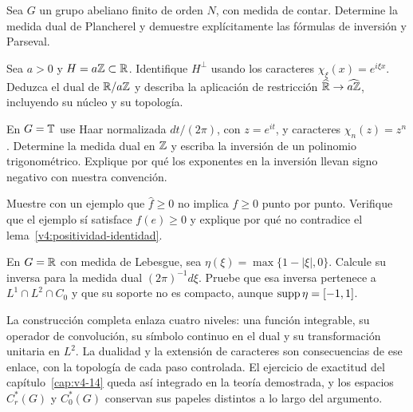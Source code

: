 \begin{ejercicio}\label{ej:v4-ampl-16-1}
Sea $G$ un grupo abeliano finito de orden $N$, con medida de contar. Determine la medida dual de Plancherel y demuestre explícitamente las fórmulas de inversión y Parseval.
\end{ejercicio}


\begin{ejercicio}\label{ej:v4-ampl-16-2}
Sea $a>0$ y $H=a\mathbb Z\subset\mathbb R$. Identifique $H^\perp$ usando los caracteres $\chi_\xi(x)=e^{i\xi x}$. Deduzca el dual de $\mathbb R/a\mathbb Z$ y describa la aplicación de restricción $\widehat{\mathbb R}\to\widehat{a\mathbb Z}$, incluyendo su núcleo y su topología.
\end{ejercicio}


\begin{ejercicio}\label{ej:v4-ampl-16-3}
En $G=\mathbb T$ use Haar normalizada $dt/(2\pi)$, con $z=e^{it}$, y caracteres $\chi_n(z)=z^n$. Determine la medida dual en $\mathbb Z$ y escriba la inversión de un polinomio trigonométrico. Explique por qué los exponentes en la inversión llevan signo negativo con nuestra convención.
\end{ejercicio}


\begin{ejercicio}\label{ej:v4-ampl-16-4}
Muestre con un ejemplo que $\widehat f\ge0$ no implica $f\ge0$ punto por punto. Verifique que el ejemplo sí satisface $f(e)\ge0$ y explique por qué no contradice el lema~\ref{v4:positividad-identidad}.
\end{ejercicio}


\begin{ejercicio}\label{ej:v4-ampl-16-5}
En $G=\mathbb R$ con medida de Lebesgue, sea $\eta(\xi)=\max\{1-|\xi|,0\}$. Calcule su inversa para la medida dual $(2\pi)^{-1}d\xi$. Pruebe que esa inversa pertenece a $L^1\cap L^2\cap C_0$ y que su soporte no es compacto, aunque $\operatorname{supp}\eta=[-1,1]$.
\end{ejercicio}


La construcción completa enlaza cuatro niveles: una función integrable, su operador de convolución, su símbolo continuo en el dual y su transformación unitaria en $L^2$. La dualidad y la extensión de caracteres son consecuencias de ese enlace, con la topología de cada paso controlada. El ejercicio de exactitud del capítulo~\ref{cap:v4-14} queda así integrado en la teoría demostrada, y los espacios $C_r^*(G)$ y $C_0^*(G)$ conservan sus papeles distintos a lo largo del argumento.
